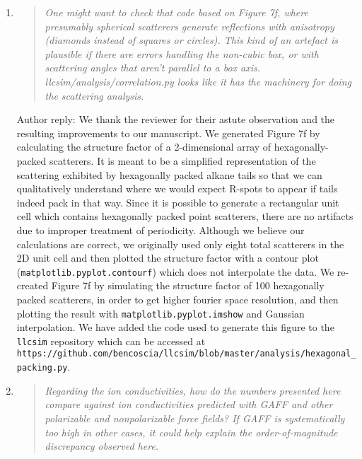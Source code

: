 \documentclass{article}
\begin{document}
\begin{enumerate}
    \item \begin{quote}
    \textit{One might want to check that code based on Figure 7f, where presumably spherical scatterers 
    generate reflections with anisotropy (diamonds instead of squares or circles). This kind of an artefact
    is plausible if there are errors handling the non-cubic box, or with scattering angles that aren't parallel
    to a box axis. llcsim/analysis/correlation.py looks like it has the machinery for doing the scattering analysis.}
	\end{quote}
	
	Author reply: We thank the reviewer for their astute observation and the resulting improvements to 
	our manuscript.	We generated Figure 7f by calculating the structure factor of a 2-dimensional array of 
	hexagonally-packed scatterers. It is meant to be a simplified representation of the scattering exhibited
	by hexagonally packed alkane tails so that we can qualitatively understand where we would expect R-spots to appear if 
	tails indeed pack in that way. Since it is possible to generate a rectangular unit cell which contains 
	hexagonally packed point scatterers, there are no artifacts due to improper treatment of periodicity. 
	Although we believe our calculations are correct, we originally used only eight total scatterers in the 
	2D unit cell and then plotted the structure factor with a contour plot (\texttt{matplotlib.pyplot.contourf})
	which does not interpolate the data. We re-created Figure 7f by simulating the structure factor of 100 
	hexagonally packed scatterers, in order to get higher fourier space resolution, and then plotting the
	result with \texttt{matplotlib.pyplot.imshow} and Gaussian interpolation. We have added the code used to
	generate this figure to the \texttt{llcsim} repository which can be accessed at 
	\texttt{https://github.com/bencoscia/llcsim/blob/master/analysis/hexagonal\_packing.py}.
	

	\item \begin{quote}	
    \textit{Regarding the ion conductivities, how do the numbers presented here compare against ion conductivities
    predicted with GAFF and other polarizable and nonpolarizable force fields? If GAFF is systematically too high
    in other cases, it could help explain the order-of-magnitude discrepancy observed here.}
    \end{quote}


\end{enumerate}
\end{document}
